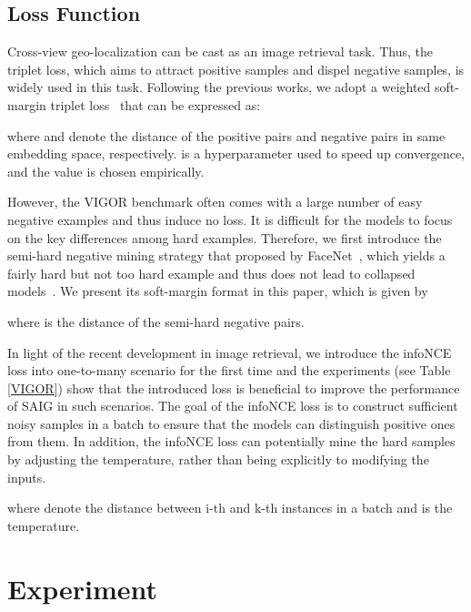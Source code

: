 \documentclass[sn-basic,iicol]{sn-jnl}
\theoremstyle{thmstyletwo}\newtheorem{example}{Example}\newtheorem{remark}{Remark}
\theoremstyle{thmstylethree}\newtheorem{definition}{Definition}
\begin{document}
\subsection{Loss Function}\label{triplet loss}
Cross-view geo-localization can be cast as an image retrieval task. Thus, the triplet loss, which aims to attract positive samples and dispel negative samples, is widely used in this task. Following the previous works, we adopt a weighted soft-margin triplet loss~\citep{hu2018cvm} that can be expressed as:

where  and  denote the  distance of the positive pairs and negative pairs in same embedding space, respectively.  is a hyperparameter used to speed up convergence, and the value is chosen empirically.

However, the VIGOR benchmark often comes with a large number of easy negative examples and thus induce no loss. It is difficult for the models to focus on the key differences among hard examples. Therefore, we first introduce the semi-hard negative mining strategy that proposed by FaceNet~\citep{schroff2015facenet}, which yields a fairly hard but not too hard example and thus does not lead to collapsed models~\citep{wu2017sampling}. We present its soft-margin format in this paper, which is given by



where  is the  distance of the semi-hard negative pairs.





In light of the recent development in image retrieval, we introduce the infoNCE loss into one-to-many scenario for the first time and the experiments (see Table \ref{VIGOR}) show that the introduced loss is beneficial to improve the performance of SAIG in such scenarios.
The goal of the infoNCE loss is to construct sufficient noisy samples in a batch to ensure that the models can distinguish positive ones from them. In addition, the infoNCE loss can potentially mine the hard samples by adjusting the temperature, rather than being explicitly to modifying the inputs. 

 
where  denote the  distance between i-th and k-th instances in a batch  and  is the temperature. 
 
 

\section{Experiment}\label{sec4}
\end{document}
